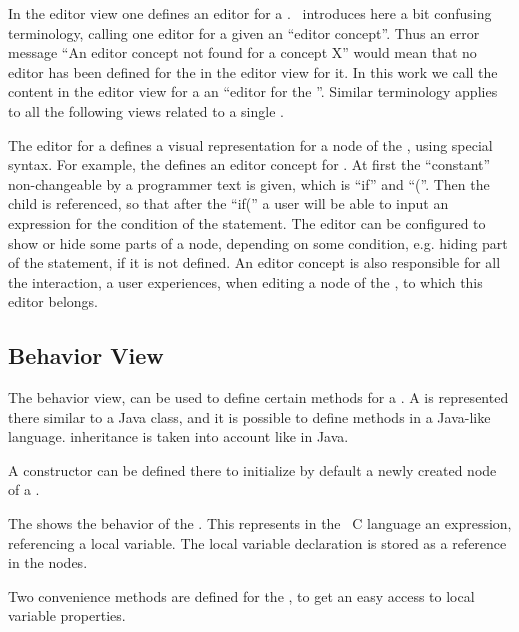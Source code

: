In the editor view one defines an editor for a . \jbmps\ introduces here a bit confusing terminology, calling one editor for a given
 an ``editor concept''. Thus an error message ``An editor concept not found for a concept X'' would mean that no editor
has been defined for the   in the editor view for it. In this work we call the content in the editor view for a   an 
``editor for the  ''. Similar terminology applies to all the following views related to a single .

The editor for a  defines a visual representation for a node of the , using special syntax. For example, the 
 defines an editor concept for . At first the ``constant'' non-changeable by a programmer text is given, which is ``if'' and ``(''. Then
the child  is referenced, so that after the ``if('' a user will be able to input an expression for the condition of the  statement.
The editor can be configured to show or hide some parts of a node, depending on some condition, e.g. hiding  part of the  statement, if it 
is not defined. An editor concept is also responsible for all the interaction, a user experiences, when editing a node of the , 
to which this editor belongs.

\subsection{Behavior View}

The behavior view, can be used to define certain methods for a . A  is represented there similar to a Java class, and
it is possible to define methods in a Java-like language.  inheritance is taken into account like in Java. 

A  constructor can be defined there to initialize by default a newly created node of a .


The  shows the behavior of the  . This  represents in the
\mbp\ C language an expression, referencing a local variable. The local variable declaration is stored as a reference 
in the  nodes.

Two convenience methods are defined for the  , to get an easy access to local variable properties.



